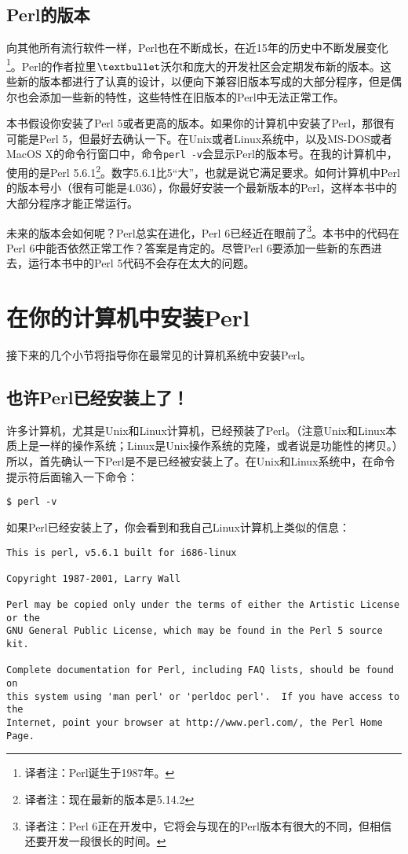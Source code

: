 \subsection{Perl的版本}
向其他所有流行软件一样，Perl也在不断成长，在近15年的历史中不断发展变化\footnote{译者注：Perl诞生于1987年。}。Perl的作者拉里$\textbullet$沃尔和庞大的开发社区会定期发布新的版本。这些新的版本都进行了认真的设计，以便向下兼容旧版本写成的大部分程序，但是偶尔也会添加一些新的特性，这些特性在旧版本的Perl中无法正常工作。

本书假设你安装了Perl 5或者更高的版本。如果你的计算机中安装了Perl，那很有可能是Perl 5，但最好去确认一下。在Unix或者Linux系统中，以及MS-DOS或者MacOS X的命令行窗口中，命令\verb|perl -v|会显示Perl的版本号。在我的计算机中，使用的是Perl 5.6.1\footnote{译者注：现在最新的版本是5.14.2}。数字5.6.1比5“大”，也就是说它满足要求。如何计算机中Perl的版本号小（很有可能是4.036），你最好安装一个最新版本的Perl，这样本书中的大部分程序才能正常运行。

未来的版本会如何呢？Perl总实在进化，Perl 6已经近在眼前了\footnote{译者注：Perl 6正在开发中，它将会与现在的Perl版本有很大的不同，但相信还要开发一段很长的时间。}。本书中的代码在Perl 6中能否依然正常工作？答案是肯定的。尽管Perl 6要添加一些新的东西进去，运行本书中的Perl 5代码不会存在太大的问题。

\section{在你的计算机中安装Perl}
接下来的几个小节将指导你在最常见的计算机系统中安装Perl。

\subsection{也许Perl已经安装上了！}
许多计算机，尤其是Unix和Linux计算机，已经预装了Perl。（注意Unix和Linux本质上是一样的操作系统；Linux是Unix操作系统的克隆，或者说是功能性的拷贝。）所以，首先确认一下Perl是不是已经被安装上了。在Unix和Linux系统中，在命令提示符后面输入一下命令：

\noindent
\verb|$ perl -v|

如果Perl已经安装上了，你会看到和我自己Linux计算机上类似的信息：

\begin{verbatim}
This is perl, v5.6.1 built for i686-linux

Copyright 1987-2001, Larry Wall

Perl may be copied only under the terms of either the Artistic License or the
GNU General Public License, which may be found in the Perl 5 source kit.

Complete documentation for Perl, including FAQ lists, should be found on
this system using 'man perl' or 'perldoc perl'.  If you have access to the
Internet, point your browser at http://www.perl.com/, the Perl Home Page.
\end{verbatim}

